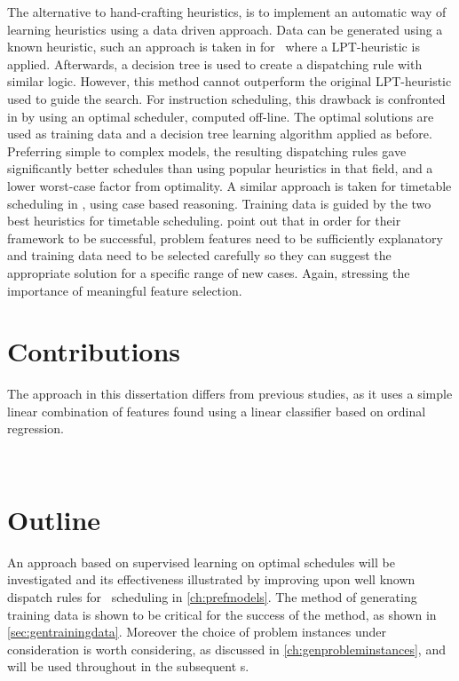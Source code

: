 The alternative to hand-crafting heuristics, is to implement an automatic way of learning heuristics using a data driven approach. %
Data can be generated using a known heuristic, such an approach is taken in \cite{Siggi05} for \jsp\, where a LPT-heuristic is applied. Afterwards, a decision tree is used to create a dispatching rule with similar logic. However, this method cannot outperform the original LPT-heuristic used to guide the search. For instruction scheduling, this drawback is confronted in \citet{Malik08,Russell09,Siggi10} by using an optimal scheduler, computed off-line. The optimal solutions are used as training data and a decision tree learning algorithm applied as before. Preferring simple to complex models, the resulting dispatching rules gave significantly better schedules than using popular heuristics in that field, and a lower worst-case factor from optimality. A similar approach is taken for timetable scheduling in \cite{Burke06}, using case based reasoning. Training data is guided by the two best heuristics for timetable scheduling. \citeauthor{Burke06} point out that in order for their framework to be successful, problem features need to be sufficiently explanatory and training data need to be selected carefully so they can suggest the appropriate solution for a specific range of new cases. Again, stressing the importance of meaningful feature selection. 

\section{Contributions}
The approach in this dissertation differs from previous studies, as it uses a simple linear combination of features found using a linear classifier based on ordinal regression.  

\hfill\\\vspace{3cm}

\section{Outline}
An approach based on supervised learning on optimal schedules will be investigated and its effectiveness illustrated by improving upon well known dispatch rules for \jsp\ scheduling in \cref{ch:prefmodels}. The method of generating training data is shown to be critical for the success of the method, as shown in \cref{sec:gentrainingdata}. Moreover the choice of problem instances under consideration is worth considering, as discussed in \cref{ch:genprobleminstances}, and will be used throughout in the subsequent s. 


